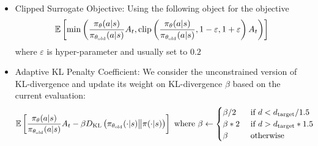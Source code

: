 \begin{itemize}
    \item Clipped Surrogate Objective: Using the following object for the objective
    \begin{equation}
        \mathbb{E}\left[ \min\left( \frac{\pi_\theta(a | s)}{\pi_{\theta_{\text{old}}}(a | s)} A_t, \operatorname{clip}\left( \frac{\pi_\theta(a | s)}{\pi_{\theta_{\text{old}}}(a | s)}, 1-\varepsilon, 1+\varepsilon \right) A_t \right) \right]
    \end{equation}
    where $\varepsilon$ is hyper-parameter and usually set to $0.2$
    \item  Adaptive KL Penalty Coefficient: We consider the unconstrained version of KL-divergence and update its weight on KL-divergence $\beta$ based on the current evaluation:
    \begin{equation}
        \begin{aligned}
            &\mathbb{E}\left[ \frac{\pi_\theta(a | s)}{\pi_{\theta_{\text{old}}}(a | s)} A_t - \beta D_{\mathrm{KL}}\left(  \pi_{\theta_\text{old}}(\cdot | s) \big\| \pi(\cdot | s) \right) \right] \text{ where } \beta \leftarrow \begin{cases}
                \beta/2 &\text{ if } d < d_{\operatorname{target}}/1.5 \\
                \beta * 2 &\text{ if } d > d_{\operatorname{target}} * 1.5 \\
                \beta &\text{ otherwise }
            \end{cases}
        \end{aligned}
    \end{equation}
\end{itemize}

